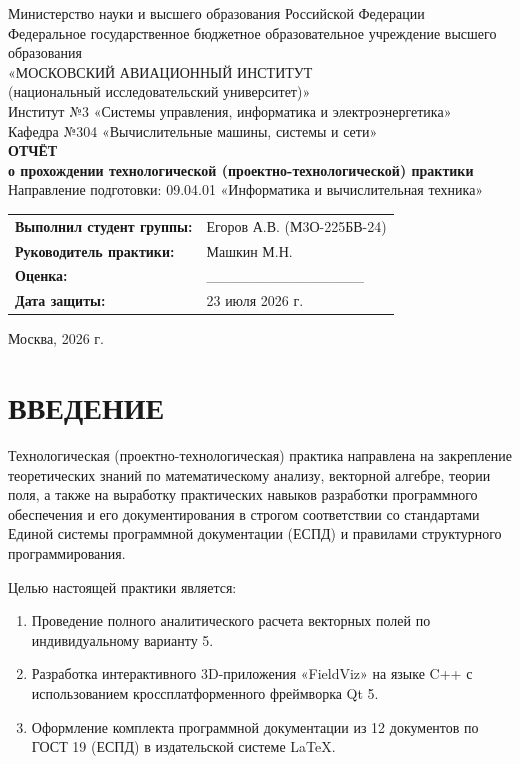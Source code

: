 \documentclass[11pt,russian]{article}
\begin{document}
\thispagestyle{empty}
\begin{center}
    Министерство науки и высшего образования Российской Федерации \\
    Федеральное государственное бюджетное образовательное учреждение высшего образования \\
    «МОСКОВСКИЙ АВИАЦИОННЫЙ ИНСТИТУТ \\
    (национальный исследовательский университет)» \\
    \vfill
    Институт №3 «Системы управления, информатика и электроэнергетика» \\
    Кафедра №304 «Вычислительные машины, системы и сети» \\
    \vfill
    \Large \textbf{ОТЧЁТ} \\
    \large \textbf{о прохождении технологической (проектно-технологической) практики} \\
    \vfill
    Направление подготовки: 09.04.01 «Информатика и вычислительная техника» \\
    \vfill
    \begin{table}[h!]
    \centering
    \begin{tabular}{ll}
        \textbf{Выполнил студент группы:} & Егоров А.В. (М3О-225БВ-24) \\
        \textbf{Руководитель практики:} & Машкин М.Н. \\
        \textbf{Оценка:} & \_\_\_\_\_\_\_\_\_\_\_\_\_\_\_ \\
        \textbf{Дата защиты:} & 23 июля 2026 г.
    \end{tabular}
    \end{table}
    \vfill
    Москва, 2026 г.
\end{center}
\newpage

\setcounter{page}{2}

\section*{ВВЕДЕНИЕ}
Технологическая (проектно-технологическая) практика направлена на закрепление теоретических знаний по математическому анализу, векторной алгебре, теории поля, а также на выработку практических навыков разработки программного обеспечения и его документирования в строгом соответствии со стандартами Единой системы программной документации (ЕСПД) и правилами структурного программирования.

Целью настоящей практики является:
\begin{enumerate}
    \item Проведение полного аналитического расчета векторных полей по индивидуальному варианту 5.
    \item Разработка интерактивного 3D-приложения «FieldViz» на языке C++ с использованием кроссплатформенного фреймворка Qt 5.
    \item Оформление комплекта программной документации из 12 документов по ГОСТ 19 (ЕСПД) в издательской системе LaTeX.
\end{enumerate}
\end{document}
